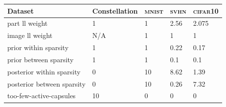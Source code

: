 \begin{center}
\centering
    \label{tab:hparams}
    \small
    \begin{tabular}{@{}lllll@{}}
        Dataset & Constellation & \textsc{mnist} & \textsc{svhn} & \textsc{cifar10} \\
        \midrule
        part ll weight & 1 & 1 & 2.56 & 2.075 \\
        image ll weight & N/A & 1 & 1 & 1\\
        prior within sparsity & 1  & 1 & 0.22 & 0.17 \\
        prior between sparsity & 1  & 1 & 0.1 & 0.1 \\
        posterior within sparsity & 0 & 10 & 8.62 & 1.39 \\
        posterior between sparsity & 0 & 10 & 0.26 & 7.32 \\
        too-few-active-capsules & 10 & 0 & 0 & 0
\end{tabular}
\end{center}

